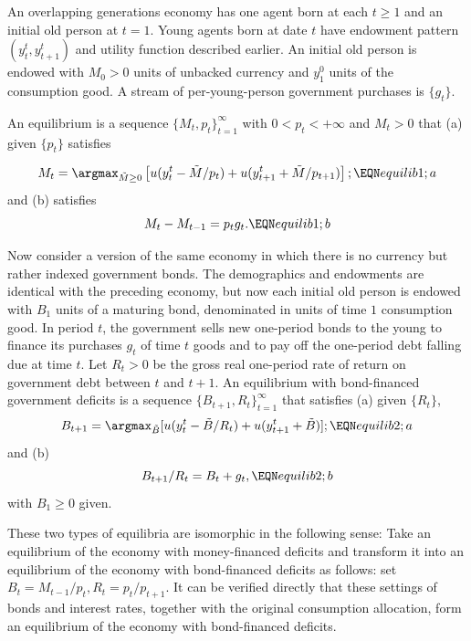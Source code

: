 An overlapping generations economy  has one agent
born at each $t\geq 1$ and an initial old  person at $t=1$.
Young agents born at date $t$ have endowment
pattern $(y_t^t, y^t_{t+1})$ and   utility function described
earlier.   An initial old person is endowed with $M_0>0$ units
of unbacked currency and $y^0_1$ units of the consumption good.
A stream of per-young-person government purchases is
$\{g_t\}$.

\medskip
{}  An equilibrium  is a sequence $\{M_t, p_t\}_{t=1}^\infty$
with $0 < p_t < +\infty$ and $M_t >0$ that (a) given $\{p_t\}$ satisfies

$$ M_t = \argmax_{\tilde M \geq 0} \left[ u(y_t^t - \tilde M/p_t)
       + u(y^t_{t+1} + \tilde M/p_{t+1})\right]; \EQN equilib1;a $$
and (b) satisfies $$ M_t - M_{t-1} = p_t g_t. \EQN equilib1;b$$



\medskip
Now consider a version  of the same economy in which there is no
currency but rather indexed government bonds.  The demographics
and endowments are identical with the preceding economy, but
now each initial old   person is endowed with
$B_1$ units of a maturing bond, denominated in units of
time $1$ consumption good.  In period $t$, the government sells
new one-period  bonds   to the young to finance its purchases
$g_t$  of time $t$ goods and to pay off the one-period debt
falling due at time $t$.  Let $R_t >0$ be the gross real one-period
rate of return on government debt between $t$ and $t+1$.
\medskip
{}  An equilibrium with bond-financed government
deficits is a sequence $\{B_{t+1}, R_t\}_{t=1}^\infty$ that
satisfies (a) given $\{R_t\}$,
$$ B_{t+1} = \argmax_{\tilde B} [ u(y_t^t -\tilde B/R_t)
    + u(y^t_{t+1} + \tilde B)]; \EQN equilib2;a $$
and (b)
$$ B_{t+1}/R_t = B_t + g_t,  \EQN equilib2;b $$
with $B_1 \geq 0$ given.

    These two types of equilibria are isomorphic in the following
sense:  Take an equilibrium of the economy with money-financed
deficits and transform it into an equilibrium of the
economy with bond-financed deficits as follows:  set
$ B_t = M_{t-1} / p_t, R_t = p_t / p_{t+1}$. It can be verified
directly that these settings of bonds and interest rates, together
with the original consumption allocation,
form an equilibrium of the economy with bond-financed deficits.

